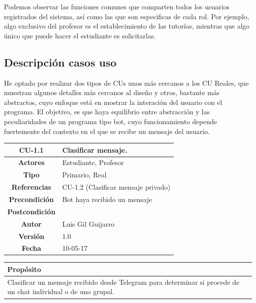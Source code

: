 Podemos observar las funciones comunes que comparten todos los usuarios registrados del sistema, así como las que son especificas de cada rol. Por ejemplo, algo exclusivo del profesor es el establecimiento de las tutorías, mientras que algo único que puede hacer el estudiante es solicitarlas.


\subsection{Descripción casos uso}

He optado por realizar dos tipos de CUs unos más cercanos a los CU Reales, que muestran algunos detalles más cercanos al diseño y otros, bastante más abstractos, cuyo enfoque está en mostrar la interación del usuario con el programa. El objetivo, es que haya equilibrio entre abstracción y las peculiaridades de un programa tipo bot, cuyo funcionamiento depende fuertemente del contexto en el que se recibe un mensaje del usuario.

\begin{table}[H]

\begin{tabular}{|c|m{10cm}|}
\hline\rowcolor{Gray}
{\bf CU-1.1 } & { Clasificar mensaje.}\\
\hline
{\bf Actores } & { Estudiante, Profesor} \\
\hline\rowcolor{Gray}
{\bf Tipo } & { Primario,  Real} \\
\hline
{\bf Referencias }& {CU-1.2 (Clasificar mensaje privado)} \\
\hline\rowcolor{Gray}
{\bf Precondición }& {Bot haya recibido un mensaje} \\
\hline
{\bf Postcondición }& {}\\
\hline\rowcolor{Gray}
{\bf Autor }& { Luis Gil Guijarro}  \\
\hline
{\bf Versión }& { 1.0} \\
\hline\rowcolor{Gray}
{\bf Fecha }& { 10-05-17} \\
\hline
\end{tabular}

\end{table}

\begin{table}[H]

\begin{tabular}{|m{10cm}|}
\hline\rowcolor{Gray}
{\bf Propósito}\\
\hline
{Clasificar un mensaje recibido desde Telegram para determinar si procede de un chat individual o de uno grupal.} \\
\hline

\end{tabular}


\end{table}

